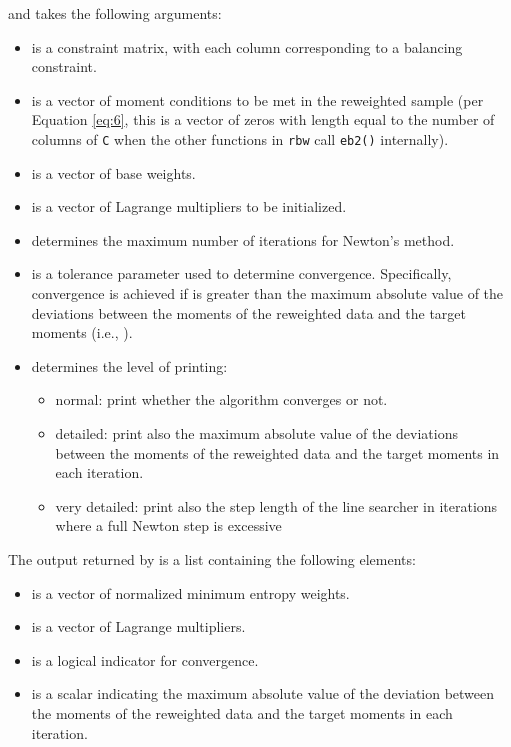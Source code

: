 and takes the following arguments:

\begin{itemize}
\tightlist
\item
   is a constraint matrix, with each column corresponding to a
  balancing constraint.
\item
   is a vector of moment conditions to be met in the reweighted
  sample (per Equation \ref{eq:6}, this is a vector of zeros with length
  equal to the number of columns of \texttt{C} when the other functions
  in \texttt{rbw} call \texttt{eb2()} internally).
\item
   is a vector of base weights.
\item
   is a vector of Lagrange multipliers to be initialized.
\item
   determines the maximum number of iterations for
  Newton's method.
\item
   is a tolerance parameter used to determine convergence.
  Specifically, convergence is achieved if  is greater than
  the maximum absolute value of the deviations between the moments of
  the reweighted data and the target moments (i.e., ).
\item
   determines the level of printing:

  \begin{itemize}
  \tightlist
  \item
     normal: print whether the algorithm converges or not.
  \item
     detailed: print also the maximum absolute value of the
    deviations between the moments of the reweighted data and the target
    moments in each iteration.
  \item
     very detailed: print also the step length of the line
    searcher in iterations where a full Newton step is excessive
  \end{itemize}
\end{itemize}

The output returned by  is a list containing the following
elements:

\begin{itemize}
\tightlist
\item
   is a vector of normalized minimum entropy weights.
\item
   is a vector of Lagrange multipliers.
\item
   is a logical indicator for convergence.
\item
   is a scalar indicating the maximum absolute value of
  the deviation between the moments of the reweighted data and the
  target moments in each iteration.
\end{itemize}

